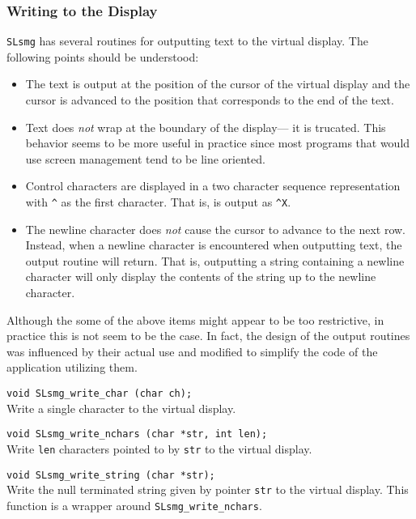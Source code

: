\subsubsection{Writing to the Display}
  
  \verb|SLsmg| has several routines for outputting text to the virtual
  display.  The following points should be understood:
\begin{itemize}   
\item The text is output at the position of the cursor of the virtual
      display and the cursor is advanced to the position that corresponds to
      the end of the text.
      
\item Text does {\em not} wrap at the boundary of the
      display--- it is trucated.  This behavior seems to be more useful in
      practice since most programs that would use screen management tend to
      be line oriented.
      
\item Control characters are displayed in a two character sequence
      representation with \verb|^| as the first character.  That is,
       is output as \verb|^X|.
      
\item The newline character does {\em not} cause the cursor to advance to
      the next row.  Instead, when a newline character is encountered when
      outputting text, the output routine will return.  That is, outputting
      a string containing a newline character will only display the contents
      of the string up to the newline character.
\end{itemize} 

  Although the some of the above items might appear to be too restrictive, in
  practice this is not seem to be the case.  In fact, the design of the
  output routines was influenced by their actual use and modified to
  simplify the code of the application utilizing them.

  \verb|void SLsmg_write_char (char ch);|\\
  Write a single character to the virtual display.
  
  \verb|void SLsmg_write_nchars (char *str, int len);|\\
  Write \verb|len| characters pointed to by \verb|str| to the virtual display. 

  \verb|void SLsmg_write_string (char *str);|\\ 
  Write the null terminated string given by pointer \verb|str| to the virtual
  display.  This function is a wrapper around \verb|SLsmg_write_nchars|.

